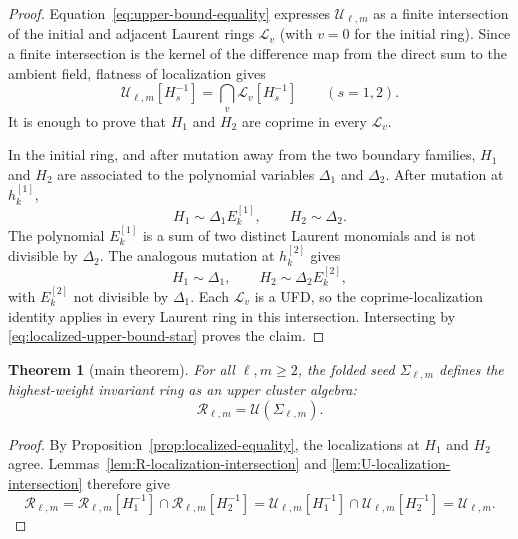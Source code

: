 \documentclass[11pt]{amsart}
\newtheorem{theorem}{Theorem}[section]
\theoremstyle{definition}
\theoremstyle{remark}
\newcommand{\cR}{\mathcal R}
\newcommand{\cU}{\mathcal U}
\begin{document}
\begin{proof}
Equation~\eqref{eq:upper-bound-equality} expresses $\cU_{\ell,m}$ as a
finite intersection of the initial and adjacent Laurent rings $\mathcal L_v$
(with $v=0$ for the initial ring).  Since a finite intersection is the kernel
of the
difference map from the direct sum to the ambient field, flatness of
localization gives
\begin{equation}
 \cU_{\ell,m}[H_s^{-1}]
 =\bigcap_v\mathcal L_v[H_s^{-1}]
 \qquad(s=1,2).
 \label{eq:localized-upper-bound-star}
\end{equation}
It is enough to prove that $H_1$ and $H_2$ are coprime in every
$\mathcal L_v$.

In the initial ring, and after mutation away from the two boundary
families, $H_1$ and $H_2$ are associated to the polynomial variables
$\Delta_1$ and $\Delta_2$.  After mutation at $h_k^{[1]}$,
\[ H_1\sim\Delta_1E_k^{[1]},\qquad H_2\sim\Delta_2. \]
The polynomial $E_k^{[1]}$ is a sum of two distinct Laurent monomials and
is not divisible by $\Delta_2$.  The analogous mutation at $h_k^{[2]}$
gives
\[ H_1\sim\Delta_1,\qquad H_2\sim\Delta_2E_k^{[2]}, \]
with $E_k^{[2]}$ not divisible by $\Delta_1$.  Each $\mathcal L_v$ is a
UFD, so the coprime-localization identity applies in every Laurent ring in this
intersection.
Intersecting by \eqref{eq:localized-upper-bound-star} proves the claim.
\end{proof}

\begin{theorem}[main theorem]
\label{thm:main-equality}
For all $\ell,m\ge2$, the folded seed $\Sigma_{\ell,m}$ defines the
highest-weight invariant ring as an upper cluster algebra:
\[ \cR_{\ell,m}=\mathcal U(\Sigma_{\ell,m}). \]
\end{theorem}

\begin{proof}
By Proposition~\ref{prop:localized-equality}, the localizations at $H_1$ and
$H_2$ agree.  Lemmas~\ref{lem:R-localization-intersection} and
\ref{lem:U-localization-intersection} therefore give
\[ \cR_{\ell,m} =\cR_{\ell,m}[H_1^{-1}]\cap\cR_{\ell,m}[H_2^{-1}] =\cU_{\ell,m}[H_1^{-1}]\cap\cU_{\ell,m}[H_2^{-1}] =\cU_{\ell,m}. \]
\end{proof}

\end{document}
